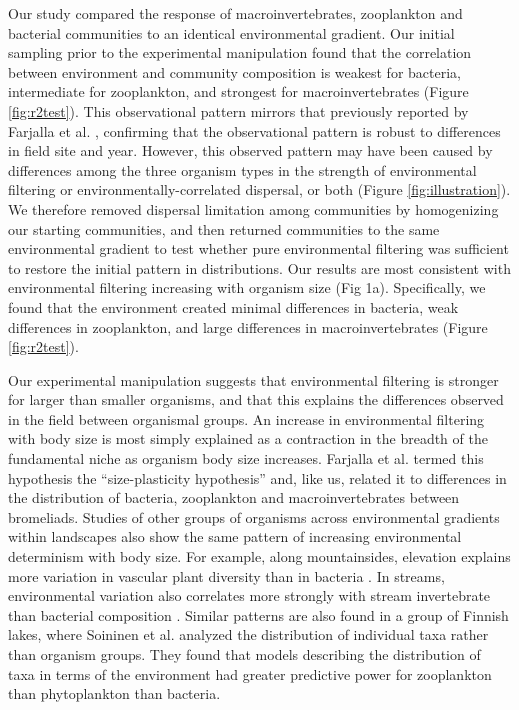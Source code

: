 Our study compared the response of macroinvertebrates, zooplankton and
bacterial communities to an identical environmental gradient. Our
initial sampling prior to the experimental manipulation found that the
correlation between environment and community composition is weakest for
bacteria, intermediate for zooplankton, and strongest for
macroinvertebrates (Figure \ref{fig:r2test}). This observational pattern mirrors that
previously reported by Farjalla et al. \citeyearpar{Farjalla2012},
confirming that the observational pattern is robust to differences in
field site and year. However, this observed pattern may have been caused
by differences among the three organism types in the strength of
environmental filtering or environmentally-correlated dispersal, or both
(Figure \ref{fig:illustration}). We therefore removed dispersal limitation among communities
by homogenizing our starting communities, and then returned communities
to the same environmental gradient to test whether pure environmental
filtering was sufficient to restore the initial pattern in
distributions. Our results are most consistent with environmental
filtering increasing with organism size (Fig 1a). Specifically, we found
that the environment created minimal differences in bacteria, weak
differences in zooplankton, and large differences in macroinvertebrates
(Figure \ref{fig:r2test}).

Our experimental manipulation suggests that environmental filtering is
stronger for larger than smaller organisms, and that this explains the
differences observed in the field between organismal groups. An increase
in environmental filtering with body size is most simply explained as a
contraction in the breadth of the fundamental niche as organism body
size increases. Farjalla et al. \citeyearpar{Farjalla2012} termed this
hypothesis the ``size-plasticity hypothesis'' and, like us, related it
to differences in the distribution of bacteria, zooplankton and
macroinvertebrates between bromeliads. Studies of other groups of
organisms across environmental gradients within landscapes also show the
same pattern of increasing environmental determinism with body size. For
example, along mountainsides, elevation explains more variation in
vascular plant diversity than in bacteria \citep{Bryant2008}. In
streams, environmental variation also correlates more strongly with
stream invertebrate than bacterial composition \citep{Wang2012b}.
Similar patterns are also found in a group of Finnish lakes, where
Soininen et al. \citeyearpar{Soininen2013} analyzed the distribution of
individual taxa rather than organism groups. They found that models
describing the distribution of taxa in terms of the environment had
greater predictive power for zooplankton than phytoplankton than
bacteria.

